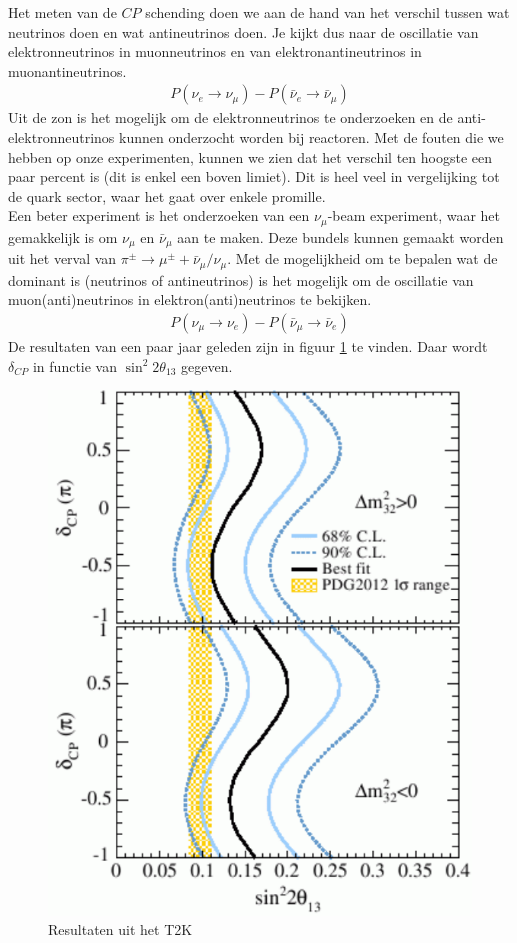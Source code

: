 \documentclass[../main.tex]{subfiles}
\begin{document}
Het meten van de $CP$ schending doen we aan de hand van het verschil tussen wat neutrinos doen en wat antineutrinos doen. Je kijkt dus naar de oscillatie van elektronneutrinos in muonneutrinos en van elektronantineutrinos in muonantineutrinos.
\begin{equation}
    \begin{aligned}
        \label{eq:cp_schending_neutrinos_1}
        P\left(\nu_{e} \rightarrow \nu_{\mu}\right)-P\left(\bar{\nu}_{e} \rightarrow \bar{\nu}_{\mu}\right)
    \end{aligned}
\end{equation}
Uit de zon is het mogelijk om de elektronneutrinos te onderzoeken en de anti-elektronneutrinos kunnen onderzocht worden bij reactoren. Met de fouten die we hebben op onze experimenten, kunnen we zien dat het verschil ten hoogste een paar percent is (dit is enkel een boven limiet). Dit is heel veel in vergelijking tot de quark sector, waar het gaat over enkele promille.\\
Een beter experiment is het onderzoeken van een $\nu_\mu$-beam experiment, waar het gemakkelijk is om $\nu_\mu$ en $\bar{\nu}_\mu$ aan te maken. Deze bundels kunnen gemaakt worden uit het verval van $\pi^\pm \rightarrow \mu^\pm + \bar{\nu}_\mu/\nu_\mu$. Met de mogelijkheid om te bepalen wat de dominant is (neutrinos of antineutrinos) is het mogelijk om de oscillatie van muon(anti)neutrinos in elektron(anti)neutrinos te bekijken.
\begin{equation}
    \begin{aligned}
        \label{eq:cp_schending_neutrinos_2}
        P\left(\nu_{\mu} \rightarrow \nu_{e}\right)-P\left(\bar{\nu}_{\mu} \rightarrow \bar{\nu}_{e}\right)
    \end{aligned}
\end{equation}
De resultaten van een paar jaar geleden zijn in figuur \ref{fig:neutrinos/t2k} te vinden. Daar wordt $\delta_{CP}$ in functie van $\sin ^{2} 2 \theta_{13}$ gegeven.

\begin{figure}[h]
    \centering
    \includegraphics[width=0.4\linewidth]{neutrinos/t2k.png}
    \caption{Resultaten uit het T2K}%
    \label{fig:neutrinos/t2k}
\end{figure}
\end{document}
